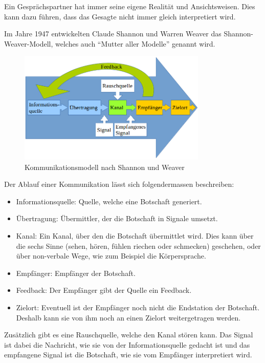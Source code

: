 Ein Gesprächspartner hat immer seine eigene Realität und Ansichtsweisen. Dies kann dazu führen, dass das Gesagte nicht immer gleich interpretiert wird. 

Im Jahre 1947 entwickelten Claude Shannon und Warren Weaver das Shannon-Weaver-Modell, welches auch "`Mutter aller Modelle"' genannt wird.

\begin{figure}[H]
  \centering
  \includegraphics[width=0.8\textwidth]{images/shannon-weaver-model.png}
  \caption[Test image for television]{Kommunikationsmodell nach Shannon und Weaver}
  \label{fig:socialengineering:Kommunikation:Kommunikationsmodell:shannon-weaver-model}
\end{figure}

Der Ablauf einer Kommunikation lässt sich folgendermassen beschreiben:
\begin{itemize}
\item Informationsquelle: Quelle, welche eine Botschaft generiert.
\item Übertragung: Übermittler, der die Botschaft in Signale umsetzt.
\item Kanal: Ein Kanal, über den die Botschaft übermittlet wird. Dies kann über die sechs Sinne (sehen, hören, fühlen riechen oder schmecken) geschehen, oder über non-verbale Wege, wie zum Beispiel die Körpersprache.
\item Empfänger: Empfänger der Botschaft.
\item Feedback: Der Empfänger gibt der Quelle ein Feedback.
\item Zielort: Eventuell ist der Empfänger noch nicht die Endstation der Botschaft. Deshalb kann sie von ihm noch an einen Zielort weitergetragen werden.
\end{itemize}
Zusätzlich gibt es eine Rauschquelle, welche den Kanal stören kann. Das Signal ist dabei die Nachricht, wie sie von der Informationsquelle gedacht ist und das empfangene Signal ist die Botschaft, wie sie vom Empfänger interpretiert wird.

